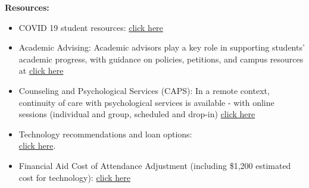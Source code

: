 \documentclass{article}
\begin{document}
\textbf{Resources:} 
\begin{itemize}
\item COVID 19 student resources: \href{https://success.ucmerced.edu/ }{click here}
\item Academic Advising: Academic advisors play a key role in supporting students' academic progress, with guidance on policies, petitions, and campus resources at 
\href{https://ns-advising.ucmerced.edu/}{click here} 
\item Counseling and Psychological Services (CAPS): In a remote context, continuity of care with psychological services is available - with online sessions (individual and group, scheduled and drop-in) \href{https://counseling.ucmerced.edu/services/counseling-services}{click here}
\item Technology recommendations and loan options: \\ 
\href{http://view.marketingcloud.ucmerced.edu/?qs=342d5ebdd778218aae068ef7b999128b2 6fd9a1d238a9912d2a07e37995760cd9146e380dcda1a54cb04ff4bface99968b1ba67a7 30f4ed18292fb994cf7faef93017fc7761a961e}{click here}.
\item Financial Aid Cost of Attendance Adjustment (including  \$1,200 estimated cost for technology): \href{https://financialaid.ucmerced.edu/COA-adjustment}{click here}
\end{itemize}
\end{document}

